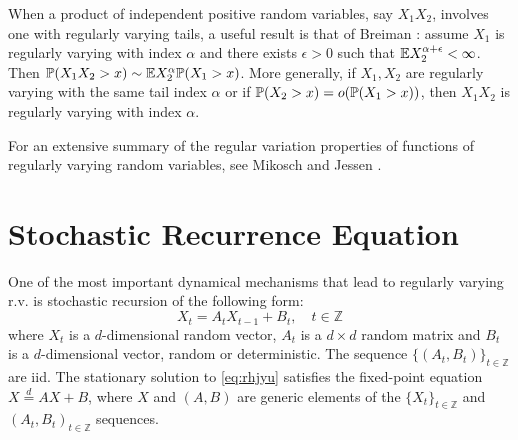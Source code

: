 When a product of independent positive random variables, say $X_1
X_2$, involves one with regularly varying tails, a useful result is
that of Breiman \cite{breiman:1965}: assume $X_1$ is regularly varying
with index $\alpha$ and there exists $\epsilon > 0$ such that
$\E X_2^{\alpha + \epsilon} < \infty$.
Then $\P(X_1 X_2 > x) \sim \E X_2^{\alpha} \P(X_1 > x)$.
More generally, if $X_1, X_2$ are regularly varying with the same tail
index $\alpha$ or if $\P(X_2 > x) = o(\P(X_1 > x))$, then $X_1 X_2$ is
regularly varying with index $\alpha$.

For an extensive summary of the regular variation properties of
functions of regularly varying random variables, see Mikosch and
Jessen \cite{JessenMikosch2006}.


\section{Stochastic Recurrence Equation}
One of the most important dynamical mechanisms that lead to regularly
varying r.v. is stochastic recursion of the following form:
\begin{equation}
  \label{eq:rhjyu}
  X_t = A_t X_{t-1} + B_t, \quad t \in \mathbb Z
\end{equation}
where $X_t$ is a $d$-dimensional random vector, $A_t$ is a $d\times d$
random matrix and $B_t$ is a $d$-dimensional vector, random or
deterministic. The sequence $\{(A_t, B_t)\}_{t \in \mathbb Z}$ are
iid. The stationary solution to \eqref{eq:rhjyu} satisfies the fixed-point
equation $X \overset{d}{=} A X + B$, where $X$ and $(A, B)$ are
generic elements of the $\{X_t\}_{t \in \mathbb Z}$ and
$(A_t, B_t)_{t \in \mathbb Z}$ sequences.

